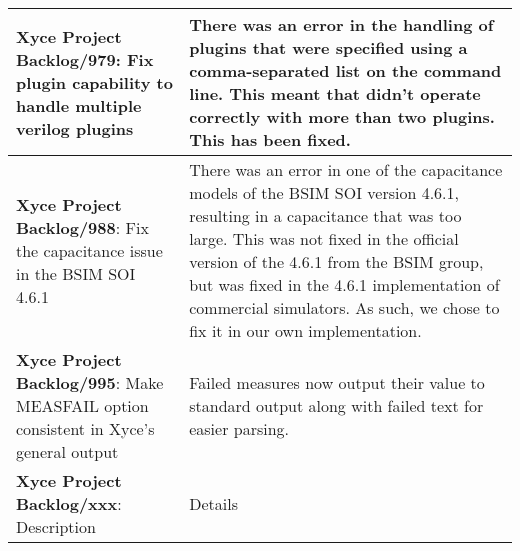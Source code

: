 {\begin{longtable}[h] {>{\raggedright\small}m{2in}|>{\raggedright\let\\\tabularnewline\small}m{3.5in}}
  \textbf{Xyce Project Backlog/979}: Fix plugin capability to handle multiple verilog plugins & There was an error in the handling of plugins that were specified using a comma-separated list on the command line.  This meant that \Xyce{} didn't operate correctly with more than two plugins.  This has been fixed.
  \\\hline
  
  \textbf{Xyce Project Backlog/988}: Fix the capacitance issue in the BSIM SOI 4.6.1 &  There was an error in one of the capacitance models of the BSIM SOI version 4.6.1, resulting in a capacitance that was too large.  This was not fixed in the official version of the 4.6.1 from the BSIM group, but was fixed in the 4.6.1 implementation of commercial simulators.  As such, we chose to fix it in our own implementation. 
  \\\hline

  \textbf{Xyce Project Backlog/995}: Make MEASFAIL option consistent in Xyce's general output &  Failed measures now output their value to standard output along with failed text for easier parsing.
  \\\hline

\textbf{Xyce Project Backlog/xxx}: Description
  &  Details
  \\\hline


\end{longtable}
}
